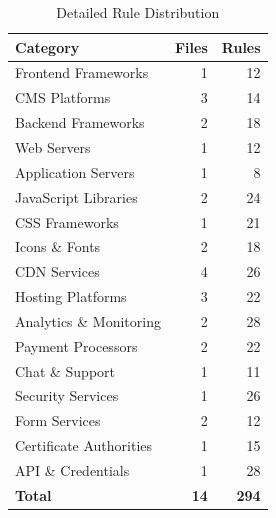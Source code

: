 \documentclass[11pt,a4paper,oneside]{article}
\begin{document}
\begin{table}[H]
\centering
\caption{Detailed Rule Distribution}
\label{tab:detailed_distribution}
\begin{tabular}{|l|r|r|}
\hline
\textbf{Category} & \textbf{Files} & \textbf{Rules} \\
\hline
Frontend Frameworks & 1 & 12 \\
CMS Platforms & 3 & 14 \\
Backend Frameworks & 2 & 18 \\
Web Servers & 1 & 12 \\
Application Servers & 1 & 8 \\
JavaScript Libraries & 2 & 24 \\
CSS Frameworks & 1 & 21 \\
Icons \& Fonts & 2 & 18 \\
CDN Services & 4 & 26 \\
Hosting Platforms & 3 & 22 \\
Analytics \& Monitoring & 2 & 28 \\
Payment Processors & 2 & 22 \\
Chat \& Support & 1 & 11 \\
Security Services & 1 & 26 \\
Form Services & 2 & 12 \\
Certificate Authorities & 1 & 15 \\
API \& Credentials & 1 & 28 \\
\hline
\textbf{Total} & \textbf{14} & \textbf{294} \\
\hline
\end{tabular}
\end{table}
\end{document}

